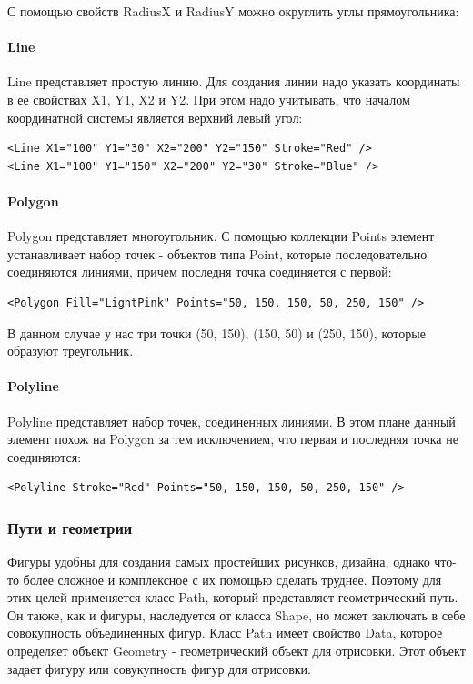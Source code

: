 С помощью свойств RadiusX и RadiusY можно округлить углы прямоугольника:

\paragraph{Line}

Line представляет простую линию. Для создания линии надо указать координаты в ее свойствах X1, Y1, X2 и Y2. При этом надо учитывать, что началом координатной системы является верхний левый угол:

\begin{verbatim}
<Line X1="100" Y1="30" X2="200" Y2="150" Stroke="Red" />
<Line X1="100" Y1="150" X2="200" Y2="30" Stroke="Blue" />
\end{verbatim}

\paragraph{Polygon}

Polygon представляет многоугольник. С помощью коллекции Points элемент устанавливает набор точек - объектов типа Point, которые последовательно соединяются линиями, причем последня точка соединяется с первой:

\begin{verbatim}
<Polygon Fill="LightPink" Points="50, 150, 150, 50, 250, 150" />
\end{verbatim}

В данном случае у нас три точки (50, 150), (150, 50) и (250, 150), которые образуют треугольник.

\paragraph{Polyline}

Polyline представляет набор точек, соединенных линиями. В этом плане данный элемент похож на Polygon за тем исключением, что первая и последняя точка не соединяются:

\begin{verbatim}
<Polyline Stroke="Red" Points="50, 150, 150, 50, 250, 150" />
\end{verbatim}

\subsubsection{Пути и геометрии}

Фигуры удобны для создания самых простейших рисунков, дизайна, однако что-то более сложное и комплексное с их помощью сделать труднее. Поэтому для этих целей применяется класс Path, который представляет геометрический путь. Он также, как и фигуры, наследуется от класса Shape, но может заключать в себе совокупность объединенных фигур. Класс Path имеет свойство Data, которое определяет объект Geometry - геометрический объект для отрисовки. Этот объект задает фигуру или совукупность фигур для отрисовки.

